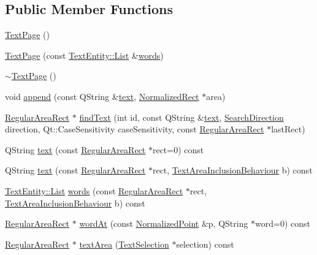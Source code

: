 \subsection*{Public Member Functions}
\begin{DoxyCompactItemize}
\item 
\hyperlink{classOkular_1_1TextPage_afb297bd4a13f9c1f130064e326499812}{Text\+Page} ()
\item 
\hyperlink{classOkular_1_1TextPage_aa7df8519615d968370ab2cca64dddee9}{Text\+Page} (const \hyperlink{classOkular_1_1TextEntity_a9deacb4422ede69001915b33ca21c023}{Text\+Entity\+::\+List} \&\hyperlink{classOkular_1_1TextPage_a4cebdb9719013a6aac4c2000d244ed93}{words})
\item 
\hyperlink{classOkular_1_1TextPage_abfc1c92bd4020d5222c93dee51700bf5}{$\sim$\+Text\+Page} ()
\item 
void \hyperlink{classOkular_1_1TextPage_a003032e4e1cd8c15f01ed639ce62d11f}{append} (const Q\+String \&\hyperlink{classOkular_1_1TextPage_a5af682e8df70faec3e9e23792e6ac6b7}{text}, \hyperlink{classOkular_1_1NormalizedRect}{Normalized\+Rect} $\ast$area)
\item 
\hyperlink{classOkular_1_1RegularAreaRect}{Regular\+Area\+Rect} $\ast$ \hyperlink{classOkular_1_1TextPage_a362d1cde5838e68fdb244c8480054b76}{find\+Text} (int id, const Q\+String \&\hyperlink{classOkular_1_1TextPage_a5af682e8df70faec3e9e23792e6ac6b7}{text}, \hyperlink{namespaceOkular_ad7ede3c5a1b1a8bfd83f133e7e3ed9d2}{Search\+Direction} direction, Qt\+::\+Case\+Sensitivity case\+Sensitivity, const \hyperlink{classOkular_1_1RegularAreaRect}{Regular\+Area\+Rect} $\ast$last\+Rect)
\item 
Q\+String \hyperlink{classOkular_1_1TextPage_a5af682e8df70faec3e9e23792e6ac6b7}{text} (const \hyperlink{classOkular_1_1RegularAreaRect}{Regular\+Area\+Rect} $\ast$rect=0) const 
\item 
Q\+String \hyperlink{classOkular_1_1TextPage_a42e170befbc39463e599e3c313fd68ba}{text} (const \hyperlink{classOkular_1_1RegularAreaRect}{Regular\+Area\+Rect} $\ast$rect, \hyperlink{classOkular_1_1TextPage_a07b135c84863f18df1d08e95aeeffd34}{Text\+Area\+Inclusion\+Behaviour} b) const 
\item 
\hyperlink{classOkular_1_1TextEntity_a9deacb4422ede69001915b33ca21c023}{Text\+Entity\+::\+List} \hyperlink{classOkular_1_1TextPage_a4cebdb9719013a6aac4c2000d244ed93}{words} (const \hyperlink{classOkular_1_1RegularAreaRect}{Regular\+Area\+Rect} $\ast$rect, \hyperlink{classOkular_1_1TextPage_a07b135c84863f18df1d08e95aeeffd34}{Text\+Area\+Inclusion\+Behaviour} b) const 
\item 
\hyperlink{classOkular_1_1RegularAreaRect}{Regular\+Area\+Rect} $\ast$ \hyperlink{classOkular_1_1TextPage_a95ed81e55002e36860bbb7c39f34a36f}{word\+At} (const \hyperlink{classOkular_1_1NormalizedPoint}{Normalized\+Point} \&p, Q\+String $\ast$word=0) const 
\item 
\hyperlink{classOkular_1_1RegularAreaRect}{Regular\+Area\+Rect} $\ast$ \hyperlink{classOkular_1_1TextPage_a5dba636c3d91b59e6782700eba2efadf}{text\+Area} (\hyperlink{classOkular_1_1TextSelection}{Text\+Selection} $\ast$selection) const 
\end{DoxyCompactItemize}


